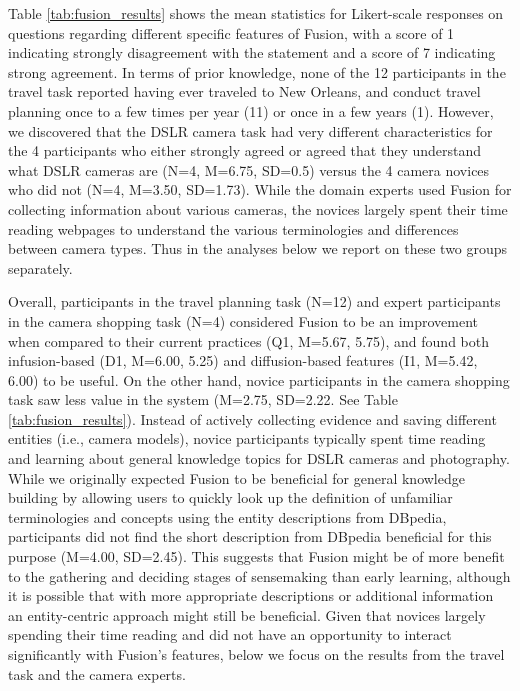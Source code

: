 Table \ref{tab:fusion_results} shows the mean statistics for Likert-scale responses on questions regarding different specific features of Fusion, with a score of 1 indicating strongly disagreement with the statement and a score of 7 indicating strong agreement. In terms of prior knowledge, none of the 12 participants in the travel task reported having ever traveled to New Orleans, and conduct travel planning once to a few times per year (11) or once in a few years (1). However, we discovered that the DSLR camera task had very different characteristics for the 4 participants who either strongly agreed or agreed that they understand what DSLR cameras are (N=4, M=6.75, SD=0.5) versus the 4 camera novices who did not (N=4, M=3.50, SD=1.73). While the domain experts used Fusion for collecting information about various cameras, the novices largely spent their time reading webpages to understand the various terminologies and differences between camera types. Thus in the analyses below we report on these two groups separately.

Overall, participants in the travel planning task (N=12) and expert participants in the camera shopping task (N=4) considered Fusion to be an improvement when compared to their current practices (Q1, M=5.67, 5.75), and found both infusion-based (D1, M=6.00, 5.25) and diffusion-based features (I1, M=5.42, 6.00) to be useful. On the other hand, novice participants in the camera shopping task saw less value in the system (M=2.75, SD=2.22. See Table \ref{tab:fusion_results}). Instead of actively collecting evidence and saving different entities (i.e., camera models), novice participants typically spent time reading and learning about general knowledge topics for DSLR cameras and photography. While we originally expected Fusion to be beneficial for general knowledge building by allowing users to quickly look up the definition of unfamiliar terminologies and concepts using the entity descriptions from DBpedia, participants did not find the short description from DBpedia beneficial for this purpose (M=4.00, SD=2.45).  This suggests that Fusion might be of more benefit to the gathering and deciding stages of sensemaking than early learning, although it is possible that with more appropriate descriptions or additional information an entity-centric approach might still be beneficial. Given that novices largely spending their time reading and did not have an opportunity to interact significantly with Fusion's features, below we focus on the results from the travel task and the camera experts.


